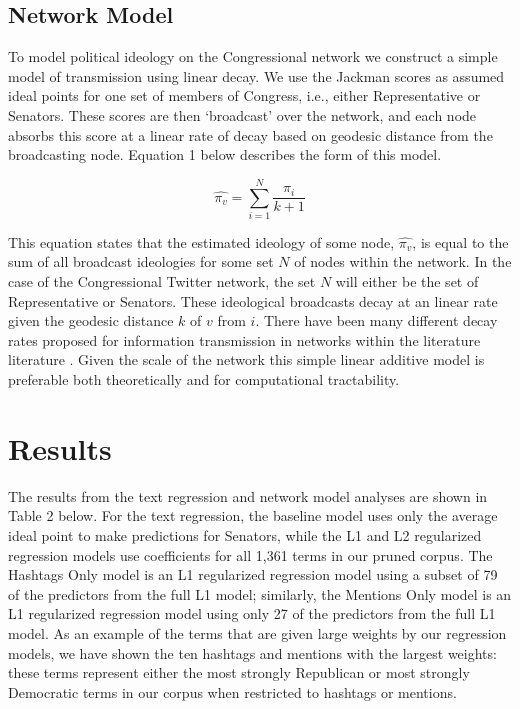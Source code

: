 \documentclass[10pt]{article}
\begin{document}
\subsection{Network Model} %
To model political ideology on the Congressional network we construct a simple model of transmission using linear decay.  We use the Jackman scores as assumed ideal points for one set of members of Congress, i.e., either Representative or Senators.  These scores are then `broadcast' over the network, and each node absorbs this score at a linear rate of decay based on geodesic distance from the broadcasting node.  Equation 1 below describes the form of this model.

\begin{equation}
    \hat{\pi_{v}} = \displaystyle\sum_{i=1}^{N} \frac{\pi_{i}}{k+1}
\end{equation}

This equation states that the estimated ideology of some node, $\hat{\pi_{v}}$, is equal to the sum of all broadcast ideologies for some set $N$ of nodes within the network.  In the case of the Congressional Twitter network, the set $N$ will either be the set of Representative or Senators.  These ideological broadcasts decay at an linear rate given the geodesic distance $k$ of $v$ from $i$.  There have been many different decay rates proposed for information transmission in networks within the literature literature \citep{Wu_2004}.  Given the scale of the network this simple linear additive model is preferable both theoretically and for computational tractability.  

\section{Results}
The results from the text regression and network model analyses are shown in Table 2 below. For the text regression, the baseline model uses only the average ideal point to make predictions for Senators, while the L1 and L2 regularized regression models use coefficients for all 1,361 terms in our pruned corpus. The Hashtags Only model is an L1 regularized regression model using a subset of 79 of the predictors from the full L1 model; similarly, the Mentions Only model is an L1 regularized regression model using only 27 of the predictors from the full L1 model. As an example of the terms that are given large weights by our regression models, we have shown the ten hashtags and mentions with the largest weights: these terms represent either the most strongly Republican or most strongly Democratic terms in our corpus when restricted to hashtags or mentions.
\end{document}
